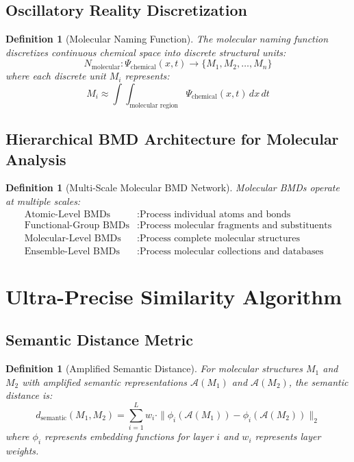 \documentclass[12pt,a4paper]{article}
\newtheorem{definition}[theorem]{Definition}
\begin{document}
\subsection{Oscillatory Reality Discretization}

\begin{definition}[Molecular Naming Function]
The molecular naming function discretizes continuous chemical space into discrete structural units:
\begin{equation}
N_{\text{molecular}}: \Psi_{\text{chemical}}(x,t) \rightarrow \{M_1, M_2, \ldots, M_n\}
\end{equation}
where each discrete unit $M_i$ represents:
\begin{equation}
M_i \approx \int\int_{\text{molecular region}} \Psi_{\text{chemical}}(x,t) \, dx \, dt
\end{equation}
\end{definition}

\subsection{Hierarchical BMD Architecture for Molecular Analysis}

\begin{definition}[Multi-Scale Molecular BMD Network]
Molecular BMDs operate at multiple scales:
\begin{align}
\text{Atomic-Level BMDs} &: \text{Process individual atoms and bonds} \\
\text{Functional-Group BMDs} &: \text{Process molecular fragments and substituents} \\
\text{Molecular-Level BMDs} &: \text{Process complete molecular structures} \\
\text{Ensemble-Level BMDs} &: \text{Process molecular collections and databases}
\end{align}
\end{definition}

\section{Ultra-Precise Similarity Algorithm}

\subsection{Semantic Distance Metric}

\begin{definition}[Amplified Semantic Distance]
For molecular structures $M_1$ and $M_2$ with amplified semantic representations $\mathcal{A}(M_1)$ and $\mathcal{A}(M_2)$, the semantic distance is:
\begin{equation}
d_{\text{semantic}}(M_1, M_2) = \sum_{i=1}^{L} w_i \cdot \|\phi_i(\mathcal{A}(M_1)) - \phi_i(\mathcal{A}(M_2))\|_2
\end{equation}
where $\phi_i$ represents embedding functions for layer $i$ and $w_i$ represents layer weights.
\end{definition}
\end{document}
